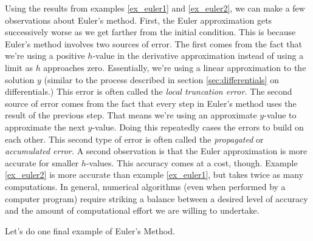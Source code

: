
Using the results from examples \ref{ex_euler1} and \ref{ex_euler2}, we can make a few observations about Euler's method.  First, the Euler approximation gets successively worse as we get farther from the initial condition.  This is because Euler's method involves two sources of error.  The first comes from the fact that we're using a positive $h$-value in the derivative approximation instead of using a limit as $h$ approaches zero.  Essentially, we're using a linear approximation to the solution $y$ (similar to the process described in section \ref{sec:differentials} on differentials.) This error is often called the \emph{local truncation error.}  The second source of error comes from the fact that every step in Euler's method uses the result of the previous step.  That means we're using an approximate $y$-value to approximate the next $y$-value.  Doing this repeatedly cases the errors to build on each other.  This second type of error is often called the \emph{propagated} or \emph{accumulated error.} A second observation is that the Euler approximation is more accurate for smaller $h$-values.  This accuracy comes at a cost, though.  Example \ref{ex_euler2} is more accurate than example \ref{ex_euler1}, but takes twice as many computations.  In general, numerical algorithms (even when performed by a computer program) require striking a balance between a desired level of accuracy and the amount of computational effort we are willing to undertake.

Let's do one final example of Euler's Method.\\

